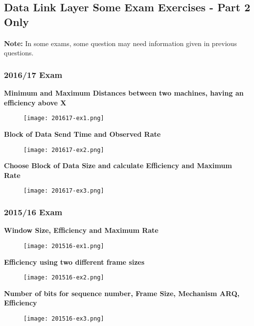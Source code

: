 \documentclass[../resumosRCOM.tex]{subfiles}
\begin{document}
\subsection{Data Link Layer Some Exam Exercises - Part 2 Only}
\paragraph{}
\textbf{Note: } 
In some exams, some question may need information given in previous questions.

\subsubsection{2016/17 Exam}

\textbf{Minimum and Maximum Distances between two machines, having an 
efficiency above X}
\begin{figure}[H]
    \centering
    \texttt{[image: 201617-ex1.png]}
\end{figure}

\textbf{Block of Data Send Time and Observed Rate}
\begin{figure}[H]
    \centering
    \texttt{[image: 201617-ex2.png]}
\end{figure}

\textbf{Choose Block of Data Size and calculate Efficiency and Maximum Rate}
\begin{figure}[H]
    \centering
    \texttt{[image: 201617-ex3.png]}
\end{figure}

\subsubsection{2015/16 Exam}

\textbf{Window Size, Efficiency and Maximum Rate}
\begin{figure}[H]
    \centering
    \texttt{[image: 201516-ex1.png]}
\end{figure}

\textbf{Efficiency using two different frame sizes}
\begin{figure}[H]
    \centering
    \texttt{[image: 201516-ex2.png]}
\end{figure}

\textbf{Number of bits for sequence number, Frame Size, Mechanism ARQ, Efficiency}
\begin{figure}[H]
    \centering
    \texttt{[image: 201516-ex3.png]}
\end{figure}
\end{document}
